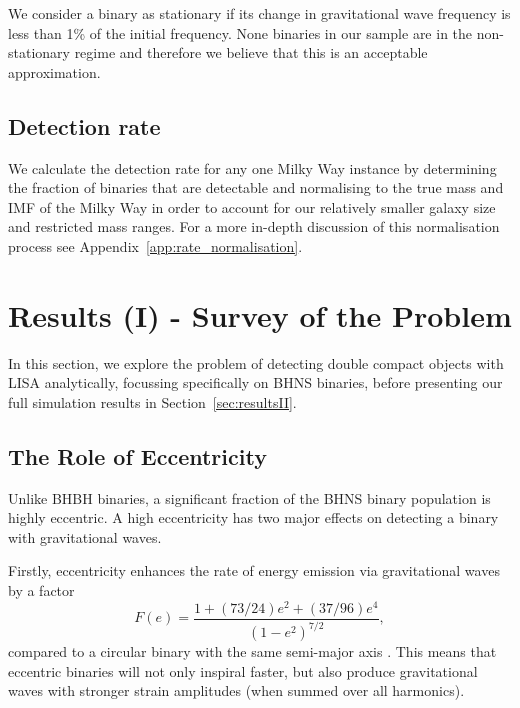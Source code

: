 \documentclass[twocolumn]{aastex63}
\begin{document}
We consider a binary as stationary if its change in gravitational wave frequency is less than 1\% of the initial frequency. None binaries in our sample are in the non-stationary regime and therefore we believe that this is an acceptable approximation.

\subsection{Detection rate}
We calculate the detection rate for any one Milky Way instance by determining the fraction of binaries that are detectable and normalising to the true mass and IMF of the Milky Way in order to account for our relatively smaller galaxy size and restricted mass ranges. For a more in-depth discussion of this normalisation process see Appendix~\ref{app:rate_normalisation}.

\section{Results (I)  - Survey of the Problem} \label{sec:resultsI}

In this section, we explore the problem of detecting double compact objects with LISA analytically, focussing specifically on BHNS binaries, before presenting our full simulation results in Section~\ref{sec:resultsII}.

\subsection{The Role of Eccentricity}\label{sec:eccentricity_role}

Unlike BHBH binaries, a significant fraction of the BHNS binary population is highly eccentric. A high eccentricity has two major effects on detecting a binary with gravitational waves.

Firstly, eccentricity enhances the rate of energy emission via gravitational waves by a factor
\begin{equation}
    F(e) = \frac{1 + (73 / 24) e^2 + (37 / 96) e^4}{(1 - e^2)^{7/2}},
\end{equation}
compared to a circular binary with the same semi-major axis \citep[][Eq.\,17]{Peters1963}. This means that eccentric binaries will not only inspiral faster, but also produce gravitational waves with stronger strain amplitudes (when summed over all harmonics).
\end{document}

